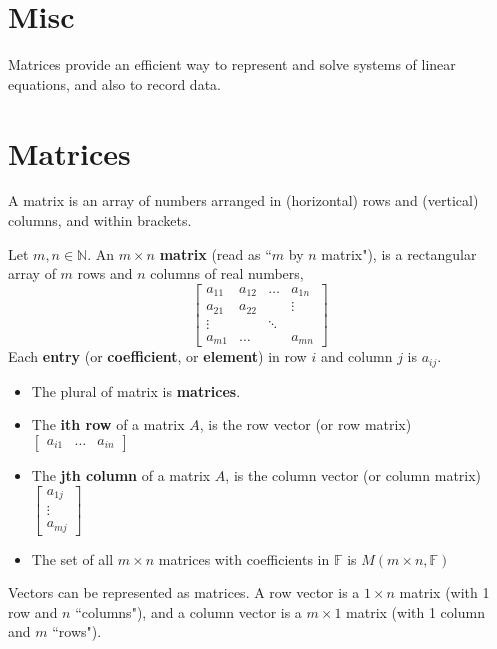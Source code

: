 \documentclass[letterpaper,12pt]{article}
\begin{document}
\section*{Misc}


Matrices provide an efficient way to represent and solve systems of linear equations, and also to record data.

\section*{Matrices}
A matrix is an array of numbers arranged in (horizontal) rows and (vertical) columns, and within brackets.

\begin{definition}
Let $m, n \in \mathbb{N}$. An $m \times n$ \textbf{matrix} (read as ``$m$ by $n$ matrix"), is a rectangular array of $m$ rows and $n$ columns of real numbers,
\begin{equation*}
    \begin{bmatrix}
    a_{11} & a_{12} & \dots & a_{1n} \\
    a_{21} & a_{22} & & \vdots \\
    \vdots & & \ddots & \\
    a_{m1} & \dots & & a_{mn}
    \end{bmatrix}
\end{equation*}
Each \textbf{entry} (or \textbf{coefficient}, or \textbf{element}) in row $i$ and column $j$ is $a_{ij}$.
\begin{itemize}
    \item The plural of matrix is \textbf{matrices}.
    \item The \textbf{ith row} of a matrix $A$, is the row vector (or row matrix) $\begin{bmatrix} a_{i1} & \dots & a_{in} \end{bmatrix}$
    \item The \textbf{jth column} of a matrix $A$, is the column vector (or column matrix) $\begin{bmatrix} a_{1j} \\ \vdots \\ a_{mj} \end{bmatrix}$
    \item The set of all $m \times n$ matrices with coefficients in $\mathbb{F}$ is $M(m \times n, \mathbb{F})$
\end{itemize}
\end{definition}

Vectors can be represented as matrices. A row vector is a $1 \times n$ matrix (with 1 row and $n$ ``columns"), and a column vector is a $m \times 1$ matrix (with 1 column and $m$ ``rows").
\end{document}
